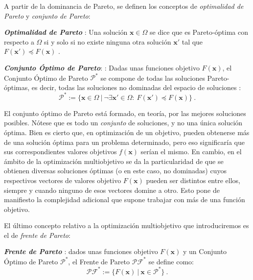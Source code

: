 A partir de la dominancia de Pareto, se definen los conceptos de \emph{optimalidad de Pareto} y \emph{conjunto de Pareto}:
\begin{definicion}
	\emph{\textbf{Optimalidad de Pareto} }: Una solución $\textbf{x} \in \Omega$ se dice que es Pareto-óptima con respecto a $\Omega$ si y solo si no existe ninguna otra solución $\textbf{x}'$ tal que $F(\textbf{x}') \preceq F(\textbf{x})$ \cite{coello2007evolutionary} \cite{miettinen2012nonlinear}.
\end{definicion}

\begin{definicion}
	\emph{\textbf{Conjunto Óptimo de Pareto}}:
: Dadas unas funciones objetivo $F(\textbf{x})$, el Conjunto Óptimo de Pareto $\mathcal{P}^*$ se compone de todas las soluciones Pareto-óptimas, es decir, todas las soluciones no dominadas del espacio de soluciones  \cite{coello2007evolutionary}:
	\begin{equation}
		\mathcal{P}^* := \{\textbf{x} \in \Omega ~|~ \neg \exists \textbf{x}' \in \Omega:~F(\textbf{x}') \preceq F(\textbf{x}) \}~.
	\end{equation}
\end{definicion}

El conjunto óptimo de Pareto está formado, en teoría, por las mejores soluciones posibles. Nótese que es todo un \emph{conjunto} de soluciones, y no una única solución óptima. Bien es cierto que, en optimización de un objetivo, pueden obtenerse más de una solución óptima para un problema determinado, pero eso significaría que sus correspondientes valores objetivos $f(\textbf{x})$ serían el mismo. En cambio, en el ámbito de la optimización multiobjetivo se da la particularidad de que se obtienen diversas soluciones óptimas (o en este caso, no dominadas) cuyos respectivos vectores de valores objetivo $F(\textbf{x})$ pueden ser distintos entre ellos, siempre y cuando ninguno de esos vectores domine a otro. Esto pone de manifiesto la complejidad adicional que supone trabajar con más de una función objetivo.

El último concepto relativo a la optimización multiobjetivo que introduciremos es el de \emph{frente de Pareto}:


\begin{definicion}
	\emph{\textbf{Frente de Pareto} \cite{coello2007evolutionary}}: dados unas funciones objetivo $F(\textbf{x})$ y un Conjunto Óptimo de Pareto $\mathcal{P}^*$, el Frente de Pareto $\mathcal{PF}^*$ se define como:
	\begin{equation}
		\mathcal{PF}^* := \{ F(\textbf{x}) ~|~ \textbf{x} \in \mathcal{P}^*\}~.
	\end{equation}
\end{definicion}

